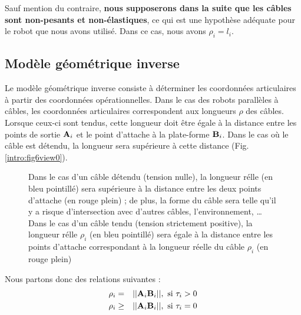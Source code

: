 Sauf mention du contraire, {\bf nous supposerons dans la suite que les câbles 
sont non-pesants et non-élastiques}, ce qui est une hypothèse adéquate pour le 
robot que nous avons utilisé. Dans ce cas, nous avons $\rho_i = l_i$.

\subsection{Modèle géométrique inverse} \label{chap0-1-1}

Le modèle géométrique inverse consiste à déterminer les coordonnées 
articulaires à partir des coordonnées opérationnelles. Dans le cas des robots 
parallèles à câbles, les coordonnées articulaires correspondent aux longueurs 
$\rho$ des câbles. Lorsque ceux-ci sont tendus, cette longueur doit être égale à 
la distance entre les points de sortie ${\bf A}_i$ et le point d'attache à la 
plate-forme ${\bf B}_i$. Dans le cas où le câble est détendu, la longueur sera 
supérieure à cette distance (Fig.\ref{intro:fig6view0}).\\

\begin{figure}[!ht]
  \centering
\hfill
{}
    \caption{\footnotesize{Dans le cas d'un câble détendu (tension nulle), la 
longueur r\'elle (en bleu pointill\'e) sera supérieure à la distance entre les 
deux points d'attache (en rouge plein) ; de plus, la forme du câble sera telle 
qu'il y a risque d'intersection avec d'autres câbles, l'environnement, \dots 
Dans le cas d'un câble tendu (tension strictement positive), la 
longueur r\'elle $\rho_i$ (en bleu pointill\'e) sera \'egale à la 
distance entre les points d'attache correspondant à la longueur réelle du 
câble $\rho_i$ (en rouge plein)}}
\label{intro:fig6}
\end{figure}

Nous partons donc des relations suivantes :
\begin{eqnarray}
\rho_i &=& ||{\bf A}_i {\bf B}_i||, \hbox{ si } \tau_i > 0 \\ 
\rho_i &\geq& ||{\bf A}_i {\bf B}_i||, \hbox{ si } \tau_i = 0
\label{intro:eq1}
\end{eqnarray}

